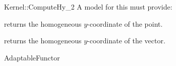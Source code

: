\begin{ccRefFunctionObjectConcept}{Kernel::ComputeHy_2}
A model for this must provide:


       {returns the homogeneous $y$-coordinate of the point.}

       {returns the homogeneous $y$-coordinate of the vector.}

\ccRefines
AdaptableFunctor



\end{ccRefFunctionObjectConcept}
